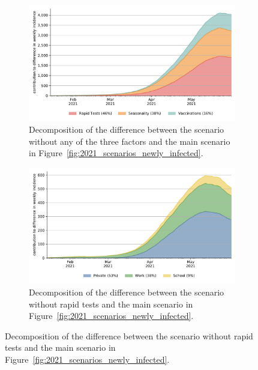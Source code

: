 \begin{figure}[!tp]
    \begin{subfigure}[b]{0.475\textwidth}
        \centering
        \includegraphics[width=\textwidth]{../figures/results/figures/full_decomposition_channels_area}
        \caption{Decomposition of the difference between the scenario without any of the
            three factors and the main scenario in
            Figure~\ref{fig:2021_scenarios_newly_infected}.}
        \label{fig:2021_scenarios_decomposition}
    \end{subfigure}
    \hfill
    \begin{subfigure}[b]{0.475\textwidth}
        \centering
        \includegraphics[width=\textwidth]{../figures/results/figures/full_decomposition_rapid_tests_area}
        \caption{Decomposition of the difference between the scenario without rapid
            tests and the main scenario in
            Figure~\ref{fig:2021_scenarios_newly_infected}.}
        \label{fig:2021_scenarios_decomposition_tests}
    \end{subfigure}


\end{figure}
